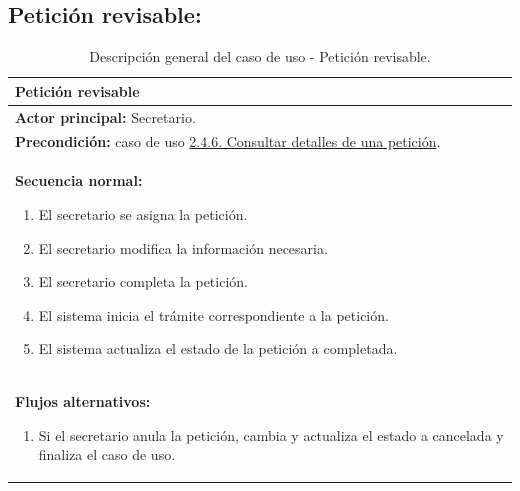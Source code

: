 \documentclass[12pt, a4paper, twoside]{report}
\begin{document}
        \subsection{Petición revisable:}
            \begin{table}[H]
            \centering
            \begin{tabular}{|p{16cm}|} 
            \hline
            \textbf{Petición revisable} \\ \hline
            \textbf{Actor principal:} Secretario. \\ \hline
            \textbf{Precondición:} caso de uso \hyperref[subsec:2.4.6.]{2.4.6. Consultar detalles de una petición}. \\ \hline
            \textbf{Secuencia normal:}
                \begin{enumerate}
                    \item El secretario se asigna la petición.
                    \item El secretario modifica la información necesaria.
                    \item El secretario completa la petición.
                    \item El sistema inicia el trámite correspondiente a la petición.
                    \item El sistema actualiza el estado de la petición a completada. 
                \end{enumerate} \\ \hline
            \textbf{Flujos alternativos:}
                \begin{enumerate}
                    \item[3.a.] Si el secretario anula la petición, cambia y actualiza el estado a cancelada y finaliza el caso de uso. 
                \end{enumerate} \\ \hline
            \end{tabular}
            \caption{Descripción general del caso de uso - Petición revisable.}
            \end{table}
\end{document}
